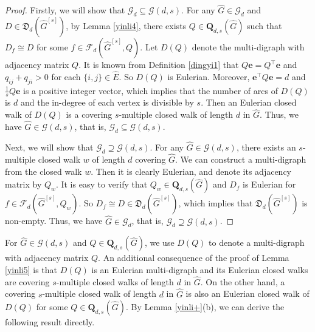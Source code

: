 \documentclass{article}
\begin{document}
\begin{proof}
Firstly,
we will show that $\mathcal{G}_{d} \subseteq \mathcal{G}(d,s)$.
For any $\widehat{G} \in \mathcal{G}_{d}$ and $D \in \mathfrak{D}_{d}(\widehat{G}^{[s]})$,
by Lemma \ref{yinli4},
there exists $Q \in \mathbf{Q}_{d,s}(\widehat{G})$ such that $D_f \cong D$ for some $f \in \mathcal{F}_{d}(\widehat{G}^{[s]},Q)$.
Let $D(Q)$ denote the multi-digraph with adjacency matrix $Q$.
It is known from Definition \ref{dingyi1} that $Q\mathbf{e}=Q^{\top}\mathbf{e}$ and $q_{ij}+q_{ji} > 0$ for each $\{i,j\} \in \widehat{E}$.
So $D(Q)$ is Eulerian.
Moreover, $\mathbf{e}^{\top}Q\mathbf{e}=d$ and $\frac{1}{s}Q\mathbf{e}$ is a positive integer vector,
which implies that the number of arcs of $D(Q)$ is $d$ and the in-degree of each vertex is divisible by $s$.
Then an Eulerian closed walk of $D(Q)$ is a covering $s$-multiple closed walk of length $d$ in $\widehat{G}$.
Thus,
we have $\widehat{G} \in \mathcal{G}(d,s)$,
that is, $\mathcal{G}_{d} \subseteq \mathcal{G}(d,s)$.

Next,
we will show that $\mathcal{G}_{d} \supseteq \mathcal{G}(d,s)$.
For any $\widehat{G} \in \mathcal{G}(d,s)$,
there exists an $s$-multiple closed walk $w$ of length $d$ covering $\widehat{G}$.
We can construct a multi-digraph from the closed walk $w$.
Then it is clearly Eulerian,
and denote its adjacency matrix by $Q_w$.
It is easy to verify that $Q_w \in \mathbf{Q}_{d,s}(\widehat{G})$ and $D_f$ is Eulerian for $f \in \mathcal{F}_{d}(\widehat{G}^{[s]},Q_w)$.
So $D_{f} \cong D \in \mathfrak{D}_{d}(\widehat{G}^{[s]})$,
which implies that $\mathfrak{D}_{d}(\widehat{G}^{[s]})$ is non-empty.
Thus,
we have $\widehat{G} \in \mathcal{G}_{d}$,
that is, $\mathcal{G}_{d} \supseteq \mathcal{G}(d,s)$.
\end{proof}

For $\widehat{G} \in \mathcal{G}(d,s)$ and $Q \in \mathbf{Q}_{d,s}(\widehat{G})$,
we use $D(Q)$ to denote a multi-digraph with adjacency matrix $Q$.
An additional consequence of the proof of Lemma \ref{yinli5} is that $D(Q)$ is an Eulerian multi-digraph and its Eulerian closed walks are covering $s$-multiple closed walks of length $d$ in $\widehat{G}$.
On the other hand,
a covering $s$-multiple closed walk of length $d$ in $\widehat{G}$ is also an Eulerian closed walk of $D(Q)$ for some $Q \in \mathbf{Q}_{d,s}(\widehat{G})$.
By Lemma \ref{yinli+}(b),
we can derive the following result directly.
\end{document}
